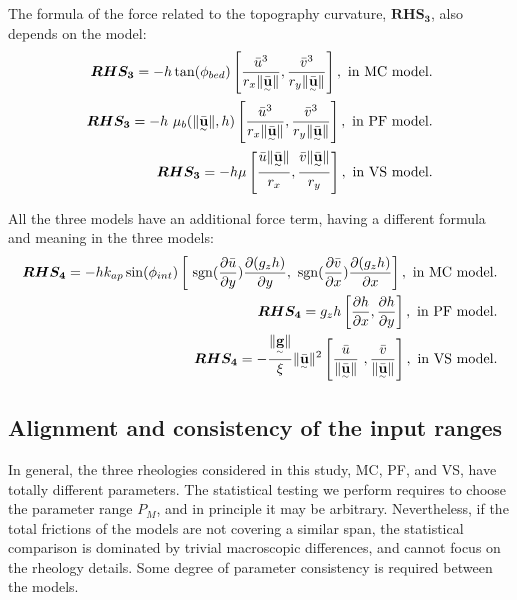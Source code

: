 \documentclass{article}
\begin{document}
The formula of the force related to the topography curvature, $\boldsymbol{RHS_3}$, also depends on the model:
\begin{align}
\boldsymbol{RHS_3} = -h \tan(\phi_{bed})\left[\frac{\bar{u}^3}{r_x\| \underset{^\sim}{\bar{\textbf{u}}} \|}, \frac{\bar{v}^3}{r_y\| \underset{^\sim}{\bar{\textbf{u}}} \|}\right],\textmd{ in MC model.}\nonumber\\
\boldsymbol{RHS_3} = -h\ \mu_{b}(\|\underset{^\sim}{\bar{\textbf{u}}} \|,h)\left[\frac{\bar{u}^3}{r_x\| \underset{^\sim}{\bar{\textbf{u}}} \|}, \frac{\bar{v}^3}{r_y\| \underset{^\sim}{\bar{\textbf{u}}} \|}\right],\textmd{ in PF model.}\\
\boldsymbol{RHS_3} = -h \mu\left[\frac{\bar{u}\| \underset{^\sim}{\bar{\textbf u}} \|}{r_{x}},\frac{\bar{v}\| \underset{^\sim}{\bar{\textbf u}} \|}{r_{y}}\right],\textmd{ in VS model.}\nonumber
\end{align}

All the three models have an additional force term, having a different formula and meaning in the three models:
\begin{align}
\boldsymbol{RHS_4} =  - h k_{ap}\sin(\phi_{int})\left[ \ {\rm sgn}(\frac{\partial \bar{u}}{\partial y}) \frac{\partial (g_z h)}{\partial y},\ {\rm sgn}({\frac{\partial \bar{v}}{\partial x}}) \frac{\partial (g_z h)}{\partial x}\right],\textmd{ in MC model.}\nonumber\\
\boldsymbol{RHS_4} = g_{z}h\left[\frac{\partial h}{\partial x}, \frac{\partial h}{\partial y}\right],\textmd{ in PF model.}\\
\boldsymbol{RHS_4} = -\frac{\| \underset{^\sim}{\textbf g} \|}{\xi}\| \underset{^\sim}{\bar{\textbf u}} \|^2\left[\frac{\bar{u}}{\| \underset{^\sim}{\bar{\textbf u}}\|} \ ,\frac{\bar{v}}{\| \underset{^\sim}{\bar{\textbf u}}\|}\right],\textmd{ in VS model.}\nonumber
\end{align}

\subsection{Alignment and consistency of the input ranges}\label{consistency}
In general, the three rheologies considered in this study, MC, PF, and VS, have totally different parameters. The statistical testing we perform requires to choose the parameter range $P_M$, and in principle it may be arbitrary. Nevertheless, if the total frictions of the models are not covering a similar span, the statistical comparison is dominated by trivial macroscopic differences, and cannot focus on the rheology details. Some degree of parameter consistency is required between the models.
\end{document}
